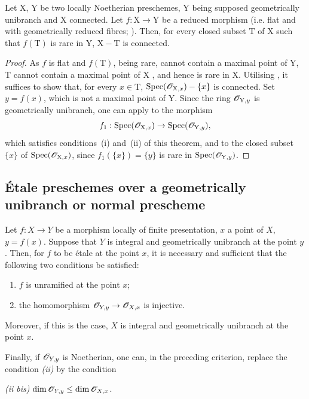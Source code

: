 \begin{corollary}[18.9.11]
\label{IV.18.9.11}
Let $\mathrm{X}$, $\mathrm{Y}$ be two locally Noetherian preschemes, $\mathrm{Y}$ being supposed geometrically unibranch and X connected.
Let $f:\mathrm{X}\to\mathrm{Y}$ be a reduced morphism (i.e. flat and with geometrically reduced fibres; ).
Then, for every closed subset $\mathrm{T}$ of $\mathrm{X}$ such that $f(\mathrm{T})$ is rare in $\mathrm{Y}$, $\mathrm{X}-\mathrm{T}$ is connected.
\end{corollary}

\begin{proof}
As $f$ is flat and $f(\mathrm{T})$, being rare, cannot contain a maximal point of Y, T cannot contain a maximal point of X , and hence is rare in X.
Utilising , it suffices to show that, for every $x\in\mathrm{T}$, $\operatorname{Spec}(\mathscr{O}_{\mathrm{X},x})-\{x\}$ is connected.
Set $y=f(x)$, which is not a maximal point of Y.
Since the ring $\mathscr{O}_{\mathrm{Y},y}$ is geometrically unibranch, one can apply  to the morphism
\[
  f_1:\operatorname{Spec}(\mathscr{O}_{\mathrm{X},x})\to\operatorname{Spec}(\mathscr{O}_{\mathrm{Y},y}),
\]
which satisfies conditions~(i) and~(ii) of this theorem, and to the closed subset $\{x\}$ of $\operatorname{Spec}(\mathscr{O}_{\mathrm{X},x})$, since $f_1(\{x\})=\{y\}$ is rare in $\operatorname{Spec}(\mathscr{O}_{\mathrm{Y},y})$.
\end{proof}
\subsection{\'Etale preschemes over a geometrically unibranch or normal prescheme}
\label{subsection:IV.18.10}

\begin{theorem}[18.10.1]
\label{IV.18.10.1}
Let $f:X\to Y$ be a morphism locally of finite presentation, $x$ a point of $X$, $y=f(x)$.
Suppose that $Y$ is integral and geometrically unibranch at the point $y$.
Then, for $f$ to be \'etale at the point $x$, it is necessary and sufficient that the following two conditions be satisfied:
\begin{enumerate}[label=\emph{\roman*)}]
  \item $f$ is unramified at the point $x$;
  \item the homomorphism $\mathscr{O}_{Y,y}\to\mathscr{O}_{X,x}$ is injective.
\end{enumerate}

Moreover, if this is the case, $X$ is integral and geometrically unibranch at the point $x$.

Finally, if $\mathscr{O}_{Y,y}$ is Noetherian, one can, in the preceding criterion, replace the condition \emph{(ii)} by the condition

\emph{(ii bis)} $\dim\mathscr{O}_{Y,y}\leq\dim\mathscr{O}_{X,x}$.
\end{theorem}


